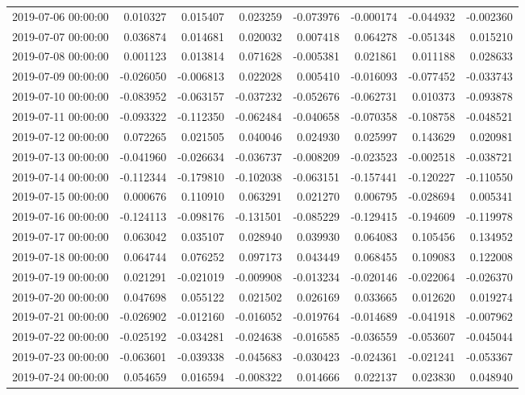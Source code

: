 \begin{tabular}{lrrrrrrr}
2019-07-06 00:00:00 & 0.010327 & 0.015407 & 0.023259 & -0.073976 & -0.000174 & -0.044932 & -0.002360 \\
2019-07-07 00:00:00 & 0.036874 & 0.014681 & 0.020032 & 0.007418 & 0.064278 & -0.051348 & 0.015210 \\
2019-07-08 00:00:00 & 0.001123 & 0.013814 & 0.071628 & -0.005381 & 0.021861 & 0.011188 & 0.028633 \\
2019-07-09 00:00:00 & -0.026050 & -0.006813 & 0.022028 & 0.005410 & -0.016093 & -0.077452 & -0.033743 \\
2019-07-10 00:00:00 & -0.083952 & -0.063157 & -0.037232 & -0.052676 & -0.062731 & 0.010373 & -0.093878 \\
2019-07-11 00:00:00 & -0.093322 & -0.112350 & -0.062484 & -0.040658 & -0.070358 & -0.108758 & -0.048521 \\
2019-07-12 00:00:00 & 0.072265 & 0.021505 & 0.040046 & 0.024930 & 0.025997 & 0.143629 & 0.020981 \\
2019-07-13 00:00:00 & -0.041960 & -0.026634 & -0.036737 & -0.008209 & -0.023523 & -0.002518 & -0.038721 \\
2019-07-14 00:00:00 & -0.112344 & -0.179810 & -0.102038 & -0.063151 & -0.157441 & -0.120227 & -0.110550 \\
2019-07-15 00:00:00 & 0.000676 & 0.110910 & 0.063291 & 0.021270 & 0.006795 & -0.028694 & 0.005341 \\
2019-07-16 00:00:00 & -0.124113 & -0.098176 & -0.131501 & -0.085229 & -0.129415 & -0.194609 & -0.119978 \\
2019-07-17 00:00:00 & 0.063042 & 0.035107 & 0.028940 & 0.039930 & 0.064083 & 0.105456 & 0.134952 \\
2019-07-18 00:00:00 & 0.064744 & 0.076252 & 0.097173 & 0.043449 & 0.068455 & 0.109083 & 0.122008 \\
2019-07-19 00:00:00 & 0.021291 & -0.021019 & -0.009908 & -0.013234 & -0.020146 & -0.022064 & -0.026370 \\
2019-07-20 00:00:00 & 0.047698 & 0.055122 & 0.021502 & 0.026169 & 0.033665 & 0.012620 & 0.019274 \\
2019-07-21 00:00:00 & -0.026902 & -0.012160 & -0.016052 & -0.019764 & -0.014689 & -0.041918 & -0.007962 \\
2019-07-22 00:00:00 & -0.025192 & -0.034281 & -0.024638 & -0.016585 & -0.036559 & -0.053607 & -0.045044 \\
2019-07-23 00:00:00 & -0.063601 & -0.039338 & -0.045683 & -0.030423 & -0.024361 & -0.021241 & -0.053367 \\
2019-07-24 00:00:00 & 0.054659 & 0.016594 & -0.008322 & 0.014666 & 0.022137 & 0.023830 & 0.048940 \\

\end{tabular}
